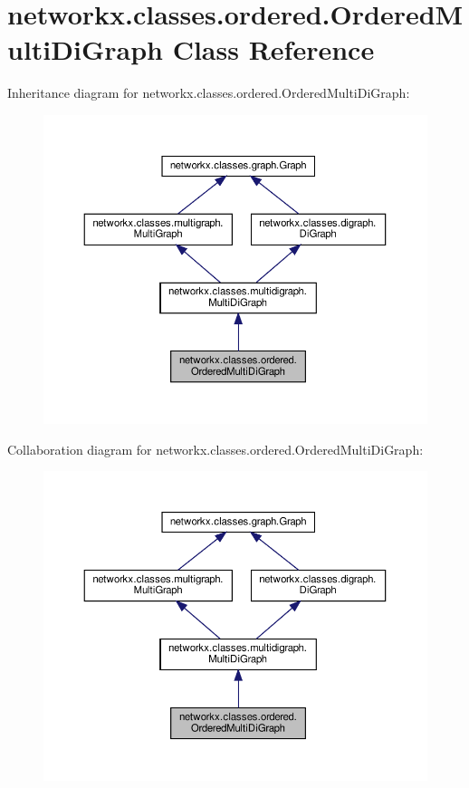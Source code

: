 \hypertarget{classnetworkx_1_1classes_1_1ordered_1_1OrderedMultiDiGraph}{}\section{networkx.\+classes.\+ordered.\+Ordered\+Multi\+Di\+Graph Class Reference}
\label{classnetworkx_1_1classes_1_1ordered_1_1OrderedMultiDiGraph}


Inheritance diagram for networkx.\+classes.\+ordered.\+Ordered\+Multi\+Di\+Graph\+:
\nopagebreak
\begin{figure}[H]
\begin{center}
\leavevmode
\includegraphics[width=350pt]{classnetworkx_1_1classes_1_1ordered_1_1OrderedMultiDiGraph__inherit__graph}
\end{center}
\end{figure}


Collaboration diagram for networkx.\+classes.\+ordered.\+Ordered\+Multi\+Di\+Graph\+:
\nopagebreak
\begin{figure}[H]
\begin{center}
\leavevmode
\includegraphics[width=350pt]{classnetworkx_1_1classes_1_1ordered_1_1OrderedMultiDiGraph__coll__graph}
\end{center}
\end{figure}
